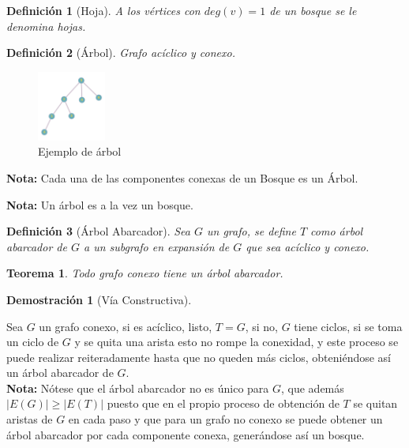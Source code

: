 \documentclass[a4paper,1pt]{report}
\newtheorem*{teo}{Teorema}
\newtheorem*{dem}{Demostración}
\newtheorem*{dfn}{Definición}
\begin{document}
\begin{dfn}[Hoja]
A los v\'ertices con $deg(v) = 1$ de un bosque se le denomina hojas.
\end{dfn}

\begin{dfn}[\'Arbol]
    Grafo ac\'iclico y conexo. 
\end{dfn}
\begin{figure}[H]
    \centering
    \includegraphics[width=0.2\textwidth]{figures2/arbol.png}
    \caption{Ejemplo de \'arbol}
\end{figure}

\textbf{Nota:} Cada una de las componentes conexas de un Bosque es un \'Arbol.

\textbf{Nota:} Un \'arbol es a la vez un bosque.

\begin{dfn}[\'Arbol Abarcador]
    Sea $G$ un grafo, se define $T$ como \'arbol abarcador de $G$ a un subgrafo en expansi\'on de $G$ que sea ac\'iclico y conexo.
\end{dfn}

\begin{teo}
    Todo grafo conexo tiene un \'arbol abarcador.
\end{teo}

\begin{dem}[V\'ia Constructiva]\end{dem}
Sea $G$ un grafo conexo, si es ac\'iclico, listo, $T = G$, si no, $G$ tiene ciclos, si se toma un ciclo de $G$ y se quita una arista esto no rompe la conexidad, y este proceso se puede realizar reiteradamente hasta que no queden m\'as ciclos, obteni\'endose as\'i un \'arbol abarcador de $G$.\\


\textbf{Nota:} N\'otese que el \'arbol abarcador no es \'unico para $G$, que adem\'as $|E(G)| \geq |E(T)|$ puesto que en el propio proceso de obtenci\'on de $T$ se quitan aristas de $G$ en cada paso y que para un grafo no conexo se puede obtener un \'arbol abarcador por cada componente conexa, gener\'andose as\'i un bosque.
\end{document}
